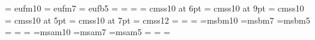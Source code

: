 \def\meqalign#1{\vcenter{\openup1\jot \mathsurround=0pt \ialign{
                &\strut\hfil$\displaystyle{##}$&$\displaystyle{{}##}$\hfil&
                \quad$##$\crcr
                #1\crcr}}}         %
\def\leftdisplay#1{\leftline{$\displaystyle{#1}$}}
\def\leftrightdisplay#1#2{\line{$\displaystyle{#1}$\hfil$\displaystyle{#2}$}}

\def\eqn#1{\eqno{({\rm #1})}}
%
%
\def\al{\alpha}
\def\be{\beta}
\def\ga{\gamma}
\def\de{\delta}
\def\ep{\epsilon}
\def\ze{\zeta}
\def\et{\eta}
\def\th{\theta}
\def\ka{\kappa}
\def\la{\lambda}
\def\rh{\rho}
\def\si{\sigma}
\def\ta{\tau}
\def\up{\upsilon}
\def\ph{\phi}
\def\ch{\chi}
\def\ps{\psi}
\def\om{\omega}
\def\veps{\varepsilon}
\def\Ga{\Gamma}
\def\De{\Delta}
\def\Th{\Theta}
\def\La{\Lambda}
\def\Si{\Sigma}
\def\Up{\Upsilon}
\def\Ph{\Phi}
\def\Ps{\Psi}
\def\Om{\Omega}   
%
%
\def\pmb#1{\setbox0=\hbox{#1}       %
     \kern-.025em\copy0\kern-\wd0
     \kern.05em\copy0\kern-\wd0
     \kern-.025em\box0}             %
\def\0{{\bf 0}}
\def\k{{\bf k}}
\def\p{{\bf p}}
\def\q{{\bf q}}
\def\x{{\bf x}}
\def\y{{\bf y}}
\def\z{{\bf z}}
\def\bL{{\bf L}}
\def\rF{{\rm F}}
\def\bDe{{\bf \De}}
\def\bphi{{\bf \Phi}}
\def\bpsi{{\bf \Psi}}
\def\bPhi{{\bf \Phi}}
\def\bPsi{{\bf \Psi}}
\def\bSi{{\bf \Si}}
\def\bC{{\bf C}}
\def\bS{{\bf S}}
\def\cA{{\cal A}}
\def\cB{{\cal B}}
\def\cE{{\cal E}}
\def\cF{{\cal F}}
\def\cG{{\cal G}}
\def\cH{{\cal H}}
\def\cI{{\cal I}}
\def\cJ{{\cal J}}
\def\cL{{\cal L}}
\def\cO{{\cal O}}
\def\cS{{\cal S}}
\def\cT{{\cal T}}
\def\cY{{\cal Y}}
%
%
\font\tenfrak                 = eufm10
\font\sevenfrak               = eufm7
\font\fivefrak                = eufb5
\newfam\frakfam
     \textfont\frakfam=\tenfrak
     \scriptfont\frakfam=\sevenfrak   
     \scriptscriptfont\frakfam=\fivefrak
\def\frak{\fam\frakfam\tenfrak}
%
\font \sixsans                = cmss10 at 6pt
\font \ninesans               = cmss10 at 9pt
\font \tensans                = cmss10
\font \fivesans               = cmss10 at 5pt
\font \sevensans              = cmss10 at 7pt
\font \twelvesans             = cmss12
\newfam\sansfam
     \textfont\sansfam=\tensans
     \scriptfont\sansfam=\sevensans
     \scriptscriptfont\sansfam=\fivesans
\def\sans{\fam\sansfam\tensans}
%
%
\font\tenmsb                  =msbm10
\font\sevenmsb                =msbm7
\font\fivemsb                 =msbm5    
\newfam\msbfam
     \textfont\msbfam=\tenmsb
     \scriptfont\msbfam=\sevenmsb   
     \scriptscriptfont\msbfam=\fivemsb
\def\msbfamno{\ifcase \msbfam 0\or 1\or 2\or 3\or 4\or 5\or 6\or 7\or 8\or
 9\or A\or B\or C\or D\or E\or F\fi}
\def\bbb{\fam\msbfam\tenmsb}
%
\font\tenmsa                   =msam10
\font\sevenmsa                 =msam7
\font\fivemsa                  =msam5 
\newfam\msafam
     \textfont\msafam=\tenmsa
     \scriptfont\msafam=\fivemsa   %
     \scriptscriptfont\msafam=\fivemsa
\def\msafamno{\ifcase \msafam 0\or 1\or 2\or 3\or 4\or 5\or 6\or 7\or 8\or
 9\or A\or B\or C\or D\or E\or F\fi}

